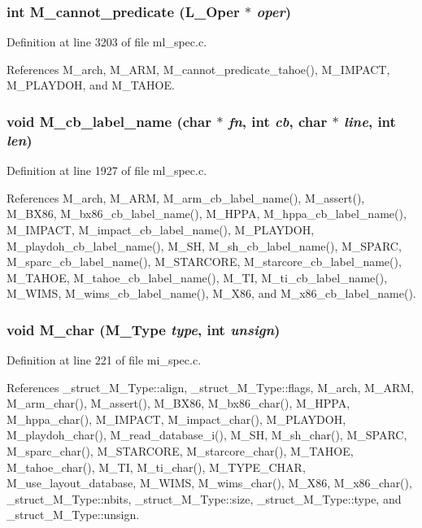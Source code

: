 \subsubsection{\setlength{\rightskip}{0pt plus 5cm}int M\_\-cannot\_\-predicate (L\_\-Oper $\ast$ {\em oper})}\label{m__spec_8h_c2ab6076679f78fe56a6b2fc04f42bdb}




Definition at line 3203 of file ml\_\-spec.c.

References M\_\-arch, M\_\-ARM, M\_\-cannot\_\-predicate\_\-tahoe(), M\_\-IMPACT, M\_\-PLAYDOH, and M\_\-TAHOE.
\subsubsection{\setlength{\rightskip}{0pt plus 5cm}void M\_\-cb\_\-label\_\-name (char $\ast$ {\em fn}, int {\em cb}, char $\ast$ {\em line}, int {\em len})}\label{m__spec_8h_5dcb9207ae2da55868286ad83d7a9edc}




Definition at line 1927 of file ml\_\-spec.c.

References M\_\-arch, M\_\-ARM, M\_\-arm\_\-cb\_\-label\_\-name(), M\_\-assert(), M\_\-BX86, M\_\-bx86\_\-cb\_\-label\_\-name(), M\_\-HPPA, M\_\-hppa\_\-cb\_\-label\_\-name(), M\_\-IMPACT, M\_\-impact\_\-cb\_\-label\_\-name(), M\_\-PLAYDOH, M\_\-playdoh\_\-cb\_\-label\_\-name(), M\_\-SH, M\_\-sh\_\-cb\_\-label\_\-name(), M\_\-SPARC, M\_\-sparc\_\-cb\_\-label\_\-name(), M\_\-STARCORE, M\_\-starcore\_\-cb\_\-label\_\-name(), M\_\-TAHOE, M\_\-tahoe\_\-cb\_\-label\_\-name(), M\_\-TI, M\_\-ti\_\-cb\_\-label\_\-name(), M\_\-WIMS, M\_\-wims\_\-cb\_\-label\_\-name(), M\_\-X86, and M\_\-x86\_\-cb\_\-label\_\-name().
\subsubsection{\setlength{\rightskip}{0pt plus 5cm}void M\_\-char (\bf{M\_\-Type} {\em type}, int {\em unsign})}\label{m__spec_8h_dc827d44a11aa7ff63e4e879617c39fe}




Definition at line 221 of file mi\_\-spec.c.

References \_\-struct\_\-M\_\-Type::align, \_\-struct\_\-M\_\-Type::flags, M\_\-arch, M\_\-ARM, M\_\-arm\_\-char(), M\_\-assert(), M\_\-BX86, M\_\-bx86\_\-char(), M\_\-HPPA, M\_\-hppa\_\-char(), M\_\-IMPACT, M\_\-impact\_\-char(), M\_\-PLAYDOH, M\_\-playdoh\_\-char(), M\_\-read\_\-database\_\-i(), M\_\-SH, M\_\-sh\_\-char(), M\_\-SPARC, M\_\-sparc\_\-char(), M\_\-STARCORE, M\_\-starcore\_\-char(), M\_\-TAHOE, M\_\-tahoe\_\-char(), M\_\-TI, M\_\-ti\_\-char(), M\_\-TYPE\_\-CHAR, M\_\-use\_\-layout\_\-database, M\_\-WIMS, M\_\-wims\_\-char(), M\_\-X86, M\_\-x86\_\-char(), \_\-struct\_\-M\_\-Type::nbits, \_\-struct\_\-M\_\-Type::size, \_\-struct\_\-M\_\-Type::type, and \_\-struct\_\-M\_\-Type::unsign.

